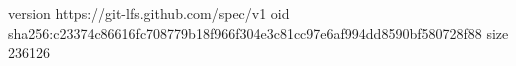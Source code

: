 version https://git-lfs.github.com/spec/v1
oid sha256:c23374c86616fc708779b18f966f304e3c81cc97e6af994dd8590bf580728f88
size 236126
